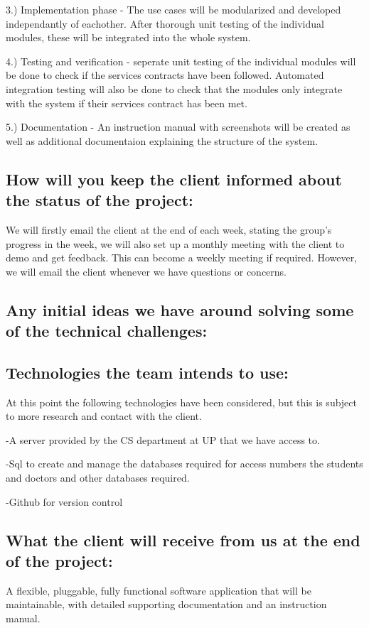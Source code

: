 \documentclass[hidelinks, 12pt, oneside]{article}
\begin{document}
3.) Implementation phase - The use cases will be modularized and developed independantly of eachother. After thorough unit testing of the individual modules, these will be integrated into the whole system. 

4.) Testing and verification - seperate unit testing of the individual modules will be done to check if the services contracts have been followed. Automated integration testing will also be done to check that the modules only integrate with the system if their services contract has been met. 

5.) Documentation - An instruction manual with screenshots will be created as well as additional documentaion explaining the structure of the system.  

\subsection{How will you keep the client informed about the status of the project:}

We will firstly email the client at the end of each  week, stating the group's progress in the week, we will also set up a monthly meeting with the client to demo and get feedback. This can become a weekly meeting if required. However, we will email the client whenever we have questions or concerns.

\subsection{Any initial ideas we have around solving some of the technical challenges:}

\subsection{Technologies the team intends to use:} 

At this point the following technologies have been considered, but this is subject to more research and contact with the client. 

-A server provided by the CS department at UP that we have access to. 

-Sql to create and manage the databases required for access numbers the students and doctors and other databases required.

-Github for version control 
 

\subsection{What the client will receive from us at the end of the project:}

A flexible, pluggable, fully functional software application  that will be maintainable, with detailed supporting documentation and an instruction manual.
\end{document}
